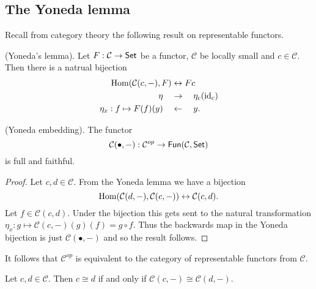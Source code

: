 \documentclass{memoir}
\begin{document}
\subsection{The Yoneda lemma}
Recall from category theory the following result on representable functors.
\begin{thm}
    (Yoneda's lemma).
    Let $F:\mathcal C\to {\normalfont\mathsf{Set}}$ be a functor, $\mathcal C$ be locally small and $c\in \mathcal C$. Then there is a natrual bijection
    \begin{align}
        \operatorname{Hom}(\mathcal C(c,-),F) &\leftrightarrow Fc \\
        \eta \quad &\rightarrow \quad \eta_c(\operatorname{id}_c) \nonumber \\
        \eta_x: f\mapsto F(f)(y) \quad &\leftarrow \quad y. \nonumber 
    \end{align}
\end{thm}
\begin{corollary}
    (Yoneda embedding).
    The functor 
    \begin{equation}
        \mathcal C(\bullet,-):\mathcal C^{op}\to {\normalfont\mathsf{Fun}}(\mathcal C, {\normalfont\mathsf{Set}})
    \end{equation}
    is full and faithful.
\end{corollary}
\begin{proof}
    Let $c,d\in \mathcal C$.
    From the Yoneda lemma we have a bijection
    \begin{equation}
        \operatorname{Hom}(\mathcal C(d,-),\mathcal C(c,-)) \leftrightarrow \mathcal C(c,d).
    \end{equation}
    Let $f\in \mathcal C(c,d)$. 
    Under the bijection this gets sent to the natural transformation $\eta_x: g\mapsto \mathcal C(c,-)(g)(f) = g\circ f$.
    Thus the backwards map in the Yoneda bijection is just $\mathcal C(\bullet, -)$ and so the result follows.
\end{proof}
\begin{remark}
    It follows that $\mathcal C^{op}$ is equivalent to the category of representable functors from $\mathcal C$.
\end{remark}
\begin{corollary}
    Let $c,d\in \mathcal C$. 
    Then $c\cong d$ if and only if $\mathcal C(c,-) \cong \mathcal C(d,-)$.
\end{corollary}
\end{document}
